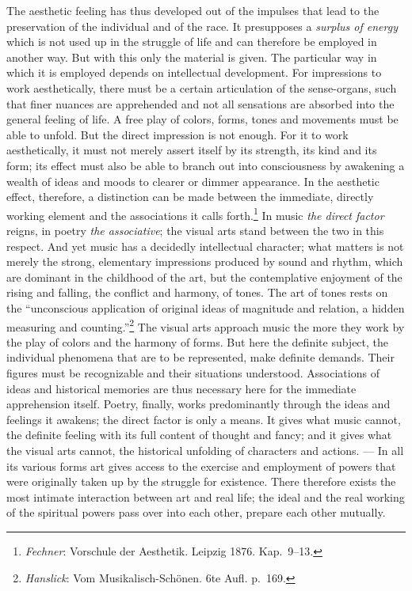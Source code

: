 \documentclass[12pt,a4paper]{book}
\newcommand{\opage}[1]{\marginnote{\footnotesize\textit{[#1]}}}
\begin{document}
The aesthetic feeling has thus developed out of the impulses that lead
to the preservation of the individual and of the race. It presupposes a
\emph{surplus of energy} which is not used up in the struggle of life
and can therefore be employed in another way. But with this only the
material is given. The particular way in which it is employed depends on
intellectual development. For impressions to work aesthetically, there
must be a certain articulation of the sense-organs, such that finer
nuances are apprehended and not all sensations are absorbed into the
general feeling of life. A free play of colors, forms, tones and
movements must be able to unfold. But the direct impression is not
enough. For it to work aesthetically, it must not merely assert itself
by its strength, its kind and its form; its effect must also be able to
branch out into consciousness by awakening a wealth of ideas and moods
to clearer or dimmer appearance. In the aesthetic effect, therefore, a
distinction can be made between the immediate, directly working element
and the associations it
calls forth.\footnote{\emph{Fechner}: Vorschule der Aesthetik. Leipzig
1876. Kap.~9--13.} In music \emph{the direct factor} reigns, in poetry
\emph{the associative}; the visual arts stand between the two in this
respect. And yet music has a decidedly intellectual character; what
matters is not merely the strong, elementary impressions produced by
sound and rhythm, which are dominant in the childhood of the art, but
the contemplative enjoyment of the rising and falling, the conflict and
harmony, of tones. The art of tones rests on the ``unconscious
application of original ideas of magnitude and relation, a hidden
measuring and
counting.''\footnote{\emph{Hanslick}: Vom Musikalisch-Schönen. 6te
Aufl. p.~169.} The visual arts approach music the more they work by the
play of colors and the harmony of forms. But
\opage{317}here the definite subject, the individual phenomena that are
to be represented, make definite demands. Their figures must be
recognizable and their situations understood. Associations of ideas and
historical memories are thus necessary here for the immediate
apprehension itself. Poetry, finally, works predominantly through the
ideas and feelings it awakens; the direct factor is only a means. It
gives what music cannot, the definite feeling with its full content of
thought and fancy; and it gives what the visual arts cannot, the
historical unfolding of characters and actions. --- In all its various
forms art gives access to the exercise and employment of powers that
were originally taken up by the struggle for existence. There therefore
exists the most intimate interaction between art and real life; the
ideal and the real working of the spiritual powers pass over into each
other, prepare each other mutually.
\end{document}
